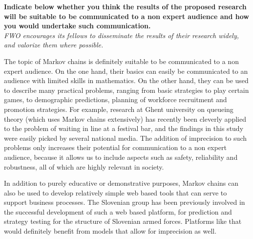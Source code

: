 \documentclass[11pt,dvipsnames,usenames,a4paper]{article}
\begin{document}


\renewcommand\refname{\normalsize Enumerate the bibliographical references that are relevant for your research proposal.}


\vspace{5mm}

\textbf{Indicate below whether you think the results of the proposed research will be suitable to be communicated to a non expert audience and how you would undertake such communication.}\\
\textit{FWO encourages its fellows to disseminate the results of their research widely, and valorize them where possible.}

The topic of Markov chains is definitely suitable to be communicated to a non expert audience. On the one hand, their basics can easily be communicated to an audience with limited skills in mathematics. On the other hand, they can be used to describe many practical problems, ranging from basic strategies to play certain games, to demographic predictions, planning of workforce recruitment and promotion strategies. For example, research at Ghent university on queueing theory (which uses Markov chains extensively) has recently been cleverly applied to the problem of waiting in line at a festival bar, and the findings in this study were easily picked by several national media.
The addition of imprecision to such problems only increases their potential for communication to a non expert audience, because it allows us to include aspects such as safety, reliability and robustness, all of which are highly relevant in society.

In addition to purely educative or demonstrative purposes, Markov chains can also be used to develop relatively simple web based tools that can serve to support business processes. The Slovenian group has been previously involved in the successful development of such a web based platform, for prediction and strategy testing for the structure of Slovenian armed forces. Platforms like that would definitely benefit from models that allow for imprecision as well.
\end{document}
